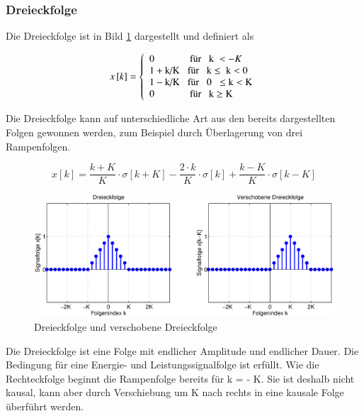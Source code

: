 \subsubsection{Dreieckfolge}

\noindent Die Dreieckfolge ist in Bild \ref{fig:Dreieckfolge} dargestellt und definiert als

\begin{equation}\label{eq:threefourty}
x\left[k\right]=\left\{\begin{array}{l} 
{0 \quad \qquad \,\; \,\text{für \; k} \; <-K} \\ 
{1+\text{k/K } \;\; \text{für \; k} \le {\rm \; } \text{k} <0} \\ 
{1-\text{k/K } \;\; \text{für \; 0 }\;\le {\rm k}<{\rm K}} \\ 
{0 \quad \qquad \, \; \, \text{für \; k} \ge \text{K}} \end{array}\right. 
\end{equation}

\noindent Die Dreieckfolge kann auf unterschiedliche Art aus den bereits dargestellten Folgen gewonnen werden, zum Beispiel durch \"{U}berlagerung von drei Rampenfolgen.

\begin{equation}\label{eq:threefourtyone}
x\left[k\right]=\frac{k+K}{K} \cdot \sigma \left[k+K\right]-\frac{2\cdot k}{K} \cdot \sigma \left[k\right]+\frac{k-K}{K} \cdot \sigma \left[k-K\right]
\end{equation}

\begin{figure}[H]
  \centerline{\includegraphics[width=1\textwidth]{Kapitel3/Bilder/image13.eps}}
  \caption{Dreieckfolge und verschobene Dreieckfolge}
  \label{fig:Dreieckfolge}
\end{figure}

\noindent Die Dreieckfolge ist eine Folge mit endlicher Amplitude und endlicher Dauer. Die Bedingung f\"{u}r eine Energie- und Leistungssignalfolge ist erf\"{u}llt. Wie die Rechteckfolge beginnt die Rampenfolge bereits f\"{u}r k = - K. Sie ist deshalb nicht kausal, kann aber durch Verschiebung um K nach rechts in eine kausale Folge \"{u}berf\"{u}hrt werden.

